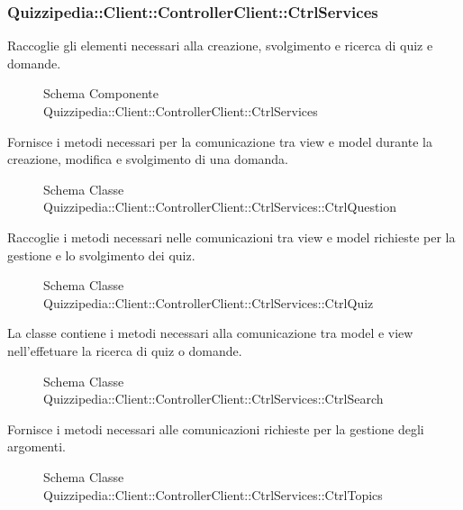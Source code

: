 \subsubsection{Quizzipedia::Client::ControllerClient::CtrlServices}
Raccoglie gli elementi necessari alla creazione, svolgimento e ricerca di quiz e domande.
\begin{figure}[H]
\centering
\noindent{}
\caption{Schema Componente Quizzipedia::Client::ControllerClient::CtrlServices}
\end{figure}
Fornisce i metodi necessari per la comunicazione tra view e model durante la creazione, modifica e svolgimento di una domanda.
\begin{figure}[H]
\centering
\noindent{}
\caption{Schema Classe Quizzipedia::Client::ControllerClient::CtrlServices::CtrlQuestion}
\end{figure}
Raccoglie i metodi necessari nelle comunicazioni tra view e model richieste per la gestione e lo svolgimento dei quiz.
\begin{figure}[H]
\centering
\noindent{}
\caption{Schema Classe Quizzipedia::Client::ControllerClient::CtrlServices::CtrlQuiz}
\end{figure}
La classe contiene i metodi necessari alla comunicazione tra model e view nell'effetuare la ricerca di quiz o domande.
\begin{figure}[H]
\centering
\noindent{}
\caption{Schema Classe Quizzipedia::Client::ControllerClient::CtrlServices::CtrlSearch}
\end{figure}
Fornisce i metodi necessari alle comunicazioni richieste per la gestione degli argomenti.
\begin{figure}[H]
\centering
\noindent{}
\caption{Schema Classe Quizzipedia::Client::ControllerClient::CtrlServices::CtrlTopics}
\end{figure}
